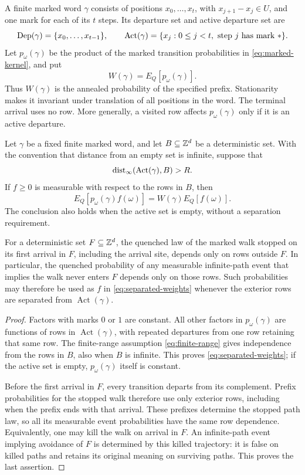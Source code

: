 A finite marked word \(\gamma\) consists of positions
\(x_0,\ldots,x_t\), with \(x_{j+1}-x_j\in U\), and one mark for each
of its \(t\) steps.  Its departure set and active departure set are
\[
 \operatorname{Dep}(\gamma)=\{x_0,\ldots,x_{t-1}\},\qquad
 \operatorname{Act}(\gamma)
 =\{x_j:0\le j<t,\ \text{step }j\text{ has mark }*\}.
\]
Let \(p_\omega(\gamma)\) be the product of the marked transition
probabilities in \eqref{eq:marked-kernel}, and put
\[
 W(\gamma)=E_Q[p_\omega(\gamma)].
\]
Thus \(W(\gamma)\) is the annealed probability of the specified prefix.
Stationarity makes it invariant under translation of all positions in
the word.  The terminal arrival uses no row.  More generally, a visited
row affects \(p_\omega(\gamma)\) only if it is an active departure.

\begin{lemma}\label{lem:separated-weights}
Let \(\gamma\) be a fixed finite marked word, and let
\(B\subseteq\mathbb Z^d\) be a deterministic set.  With the convention that
distance from an empty set is infinite, suppose that
\[
 \operatorname{dist}_\infty(\operatorname{Act}(\gamma),B)>R.
\]
If \(f\ge0\) is measurable with respect to the rows in \(B\), then
\begin{equation}\label{eq:separated-weights}
 E_Q[p_\omega(\gamma)f(\omega)]
 =W(\gamma)E_Q[f(\omega)].
\end{equation}
The conclusion also holds when the active set is empty, without a
separation requirement.

For a deterministic set \(F\subseteq\mathbb Z^d\), the quenched law of the
marked walk stopped on its first arrival in \(F\), including the arrival
site, depends only on rows outside \(F\).  In particular, the quenched
probability of any measurable infinite-path event that implies the walk
never enters \(F\) depends only on those rows.  Such probabilities may
therefore be used as \(f\) in \eqref{eq:separated-weights} whenever the
exterior rows are separated from \(\operatorname{Act}(\gamma)\).
\end{lemma}

\begin{proof}
Factors with marks \(0\) or \(1\) are constant.  All other factors in
\(p_\omega(\gamma)\) are functions of rows in
\(\operatorname{Act}(\gamma)\), with repeated departures from one row
retaining that same row.  The finite-range assumption
\eqref{eq:finite-range} gives independence from the rows in \(B\), also
when \(B\) is infinite.  This proves \eqref{eq:separated-weights}; if
the active set is empty, \(p_\omega(\gamma)\) itself is constant.

Before the first arrival in \(F\), every transition departs from its
complement.  Prefix probabilities for the stopped walk therefore use
only exterior rows, including when the prefix ends with that arrival.
These prefixes determine the stopped path law, so all its measurable
event probabilities have the same row dependence.  Equivalently, one
may kill the walk on arrival in \(F\).  An infinite-path event implying
avoidance of \(F\) is determined by this killed trajectory: it is false
on killed paths and retains its original meaning on surviving paths.
This proves the last assertion.
\end{proof}

